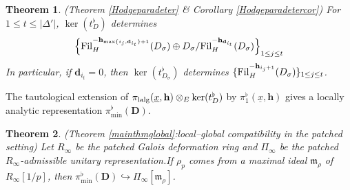 \documentclass[10pt]{article}
\newtheorem{thm}{Theorem}[section]
\newcommand{\fil}{{\rm Fil}}
\newcommand{\lalg}{{\rm lalg}}
\newcommand{\Dpik}{{\mathbf{D}}}
\newcommand{\bh}{{\mathbf{h}}}
\newcommand{\bd}{{\mathbf{d}}}
\newcommand{\fm}{{\mathfrak{m}}}
\begin{document}
\begin{thm}\label{Hodgeparadeterintro}(Theorem \ref{Hodgeparadeter} \& Corollary \ref{Hodgeparadetercor}) For $1\leq t\leq |\Delta'|$, $\ker(t^{\flat}_{D})$ determines
	\begin{equation}
		\begin{aligned}
			\Big\{\fil_H^{-\bh_{{\max\{i_{{j}},\bd_{i_{t}}\}}+1}}(D_{\sigma})\oplus D_{\sigma}/\fil_H^{-\bh_{\bd_{i_{t}}}}(D_{\sigma})\Big\}_{1\leq j\leq t}
		\end{aligned}
	\end{equation}	
	In particular, if $\bd_{i_t}=0$, then $\ker(t^{\flat}_{D_{\sigma}})$ determines $\{\fil_H^{-\bh_{i_{{j}}+1}}(D_{\sigma})\}_{1\leq j\leq t}$.\;
\end{thm}
The tautological extension of $\pi_{\lalg}(\underline{x},\bh)\otimes_E\ker(t^{\flat}_{D})$ by $\pi^{\flat}_{1}(\underline{x},\bh)$ gives a locally analytic representation $\pi^{\flat}_{\min}(\Dpik)$.\;
\begin{thm}\label{thmintor11} (Theorem \ref{mainthmglobal}:\;local--global compatibility in the patched setting) Let $R_{\infty}$ be the patched Galois deformation ring and $\Pi_{\infty}$ be the patched $R_{\infty}$-admissible unitary representation.\;If $\rho_p$ comes from a maximal ideal $\fm_{\rho}$ of $R_{\infty}[1/p]$, then $\pi^{\flat}_{\min}(\Dpik)\hookrightarrow \Pi_{\infty}[\fm_{\rho}]$.\;
\end{thm}
\end{document}

